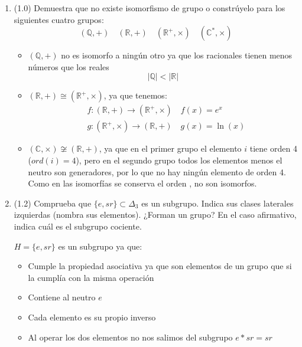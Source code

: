 \documentclass[a4paper,12pt]{article}
\begin{document}
\begin{enumerate}
    \item (1.0) Demuestra que no existe isomorfismo de grupo o constrúyelo para los siguientes cuatro grupos:
        $$
        (\mathbb{Q}, +) \quad (\mathbb{R}, +) \quad (\mathbb{R}^{+}, \times) \quad (\mathbb{C}^{*}, \times)
        $$

        \begin{itemize}
            \item $(\mathbb{Q}, +)$ no es isomorfo a ningún otro ya que los racionales tienen menos números que los reales
                $$|\mathbb{Q}| < |\mathbb{R}|$$

            \item $(\mathbb{R}, +) \cong (\mathbb{R}^{+}, \times )$, ya que tenemos:
                \begin{equation*}
                    \begin{split}
                        & f:(\mathbb{R}, +) \to (\mathbb{R}^{+}, \times) \quad f(x)=e^x\\
                        & g:(\mathbb{R}^{+}, \times) \to (\mathbb{R}, +) \quad g(x) = \ln(x)
                    \end{split}
                \end{equation*}

            \item $(\mathbb{C}, \times) \not \cong (\mathbb{R}, +)$, ya que en el primer grupo el elemento $i$ tiene orden 4 ($ord(i)=4$), pero en el segundo grupo todos los elementos menos el neutro son generadores, por lo que no hay ningún elemento de orden 4. Como en las isomorfías se conserva el orden , no son isomorfos.
        \end{itemize} 

    \item (1.2) Comprueba que $\{e, sr\} \subset \Delta_{3}$ es un subgrupo. Indica sus clases laterales izquierdas (nombra sus elementos). ¿Forman un grupo? En el caso afirmativo, indica cuál es el subgrupo cociente.
    
    $H = \{e, sr\}$ es un subgrupo ya que:
    \begin{itemize}
        \item Cumple la propiedad asociativa ya que son elementos de un grupo que si la cumplía con la misma operación
        \item Contiene al neutro $e$
        \item Cada elemento es su propio inverso
        \item Al operar los dos elementos no nos salimos del subgrupo $e * sr = sr$
    \end{itemize}


\end{enumerate}
\end{document}
